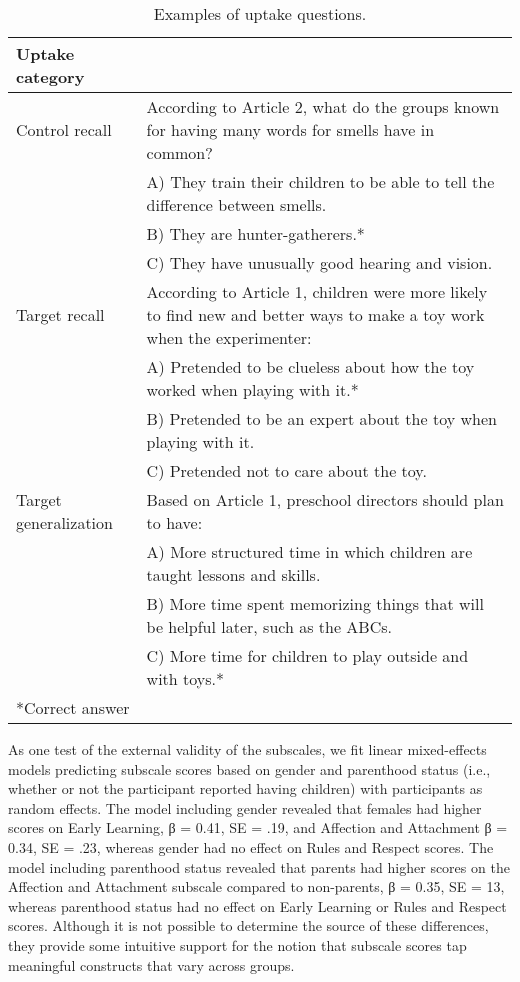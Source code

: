 \documentclass[10pt, letterpaper]{article}
\begin{document}
\begin{table*}[!h]
\centering
\begin{tabular}{p{1.25in}p{5.25in}}
  \hline
Uptake category \\ 
  \hline
Control recall 
& According to Article 2, what do the groups known for having many words for smells have in common? \\ 
  & A) They train their children to be able to tell the difference between smells.\\ 
  & B) They are hunter-gatherers.*\\ 
  & C) They have unusually good hearing and vision.\\ 
\hline
Target recall
  & According to Article 1, children were more likely to find new and better ways to make a toy work when the experimenter:\\ 
  & A) Pretended to be clueless about how the toy worked when playing with it.*\\ 
  & B) Pretended to be an expert about the toy when playing with it.\\ 
  & C) Pretended not to care about the toy.\\ 
  \hline
  Target generalization 
  & Based on Article 1, preschool directors should plan to have:\\ 
  & A) More structured time in which children are taught lessons and skills.\\ 
  & B) More time spent memorizing things that will be helpful later, such as the ABCs.\\
  & C) More time for children to play outside and with toys.*\\
   \hline
*Correct answer   
\end{tabular}
\caption{Examples of uptake questions.\label{tab:uptake}} 
\end{table*}

As one test of the external validity of the subscales, we fit linear
mixed-effects models predicting subscale scores based on gender and
parenthood status (i.e., whether or not the participant reported having
children) with participants as random effects. The model including
gender revealed that females had higher scores on Early Learning, β =
0.41, SE = .19, and Affection and Attachment β = 0.34, SE = .23, whereas
gender had no effect on Rules and Respect scores. The model including
parenthood status revealed that parents had higher scores on the
Affection and Attachment subscale compared to non-parents, β = 0.35, SE
= 13, whereas parenthood status had no effect on Early Learning or Rules
and Respect scores. Although it is not possible to determine the source
of these differences, they provide some intuitive support for the notion
that subscale scores tap meaningful constructs that vary across groups.
\end{document}

